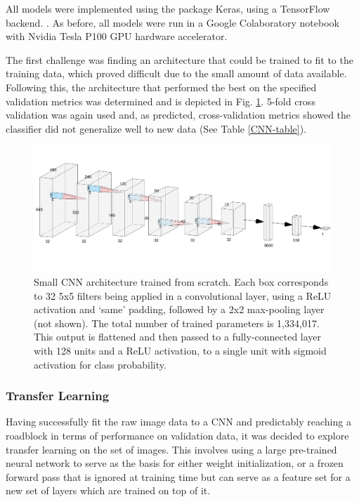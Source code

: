 \documentclass{article}
\begin{document}
	All models were implemented using the package Keras, using a TensorFlow backend. \cite{chollet2015keras}.  As before, all models were run in a Google Colaboratory notebook with Nvidia Tesla P100 GPU hardware accelerator.
	
	The first challenge was finding an architecture that could be trained to fit to the training data, which proved difficult due to the small amount of data available. Following this, the architecture that performed the best on the specified validation metrics was determined and is depicted in Fig. \ref{small-cnn}. 5-fold cross validation was again used and, as predicted, cross-validation metrics showed the classifier did not generalize well to new data (See Table 
	\ref{CNN-table}). 
	
	\begin{figure}[]
		\vskip 0.2in
		\begin{center}
			\centerline{\includegraphics[width=\columnwidth]{Archi2}}
			\caption{Small CNN architecture trained from scratch. Each box corresponds to 32 5x5 filters being applied in a convolutional layer, using a ReLU activation and `same' padding, followed by a 2x2 max-pooling layer (not shown). The total number of trained parameters is 1,334,017. This output is flattened and then passed to a fully-connected layer with 128 units and a ReLU activation, to a single unit with sigmoid activation for class probability.}
			\label{small-cnn}
		\end{center}
		\vskip -0.2in
	\end{figure}
	
	\subsubsection{Transfer Learning}
	Having successfully fit the raw image data to a CNN and predictably reaching a roadblock in terms of performance on validation data, it was decided to explore transfer learning on the set of images. This involves using a large pre-trained neural network to serve as the basis for either weight initialization, or a frozen forward pass that is ignored at training time but can serve as a feature set for a new set of layers which are trained on top of it. 
	
\end{document}
